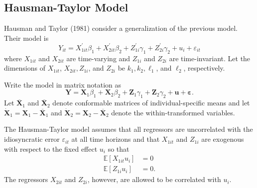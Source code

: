 \documentclass[10pt]{article}
\begin{document}
\subsection{Hausman-Taylor Model}
Hausman and Taylor (1981) consider a generalization of the previous model. Their model is
$$
Y_{i t}=X_{1 i t}^{\prime} \beta_{1}+X_{2 i t}^{\prime} \beta_{2}+Z_{1 i}^{\prime} \gamma_{1}+Z_{2 i}^{\prime} \gamma_{2}+u_{i}+\varepsilon_{i t}
$$
where $X_{1 i t}$ and $X_{2 i t}$ are time-varying and $Z_{1 i}$ and $Z_{2 i}$ are time-invariant. Let the dimensions of $X_{1 i t}$, $X_{2 i t}, Z_{1 i}$, and $Z_{2 i}$ be $k_{1}, k_{2}, \ell_{1}$, and $\ell_{2}$, respectively.

Write the model in matrix notation as
$$
\boldsymbol{Y}=\boldsymbol{X}_{1} \beta_{1}+\boldsymbol{X}_{2} \beta_{2}+\boldsymbol{Z}_{1} \gamma_{1}+\boldsymbol{Z}_{2} \gamma_{2}+\boldsymbol{u}+\boldsymbol{\varepsilon} .
$$
Let $\overline{\boldsymbol{X}}_{1}$ and $\overline{\boldsymbol{X}}_{2}$ denote conformable matrices of individual-specific means and let $\dot{\boldsymbol{X}}_{1}=\boldsymbol{X}_{1}-\overline{\boldsymbol{X}}_{1}$ and $\dot{\boldsymbol{X}}_{2}=\boldsymbol{X}_{2}-\overline{\boldsymbol{X}}_{2}$ denote the within-transformed variables.

The Hausman-Taylor model assumes that all regressors are uncorrelated with the idiosyncratic error $\varepsilon_{i t}$ at all time horizons and that $X_{1 i t}$ and $Z_{1 i}$ are exogenous with respect to the fixed effect $u_{i}$ so that
$$
\begin{aligned}
\mathbb{E}\left[X_{1 i t} u_{i}\right] &=0 \\
\mathbb{E}\left[Z_{1 i} u_{i}\right] &=0 .
\end{aligned}
$$
The regressors $X_{2 i t}$ and $Z_{2 i}$, however, are allowed to be correlated with $u_{i}$.
\end{document}
